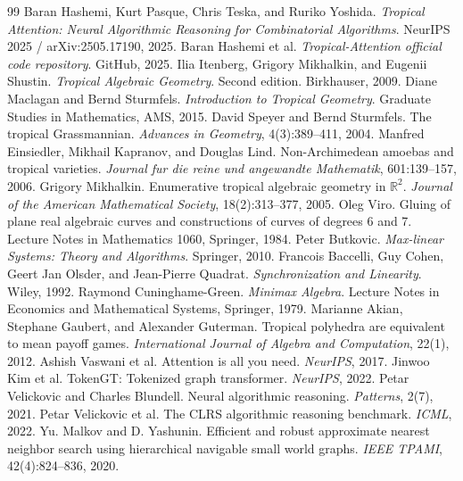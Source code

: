 \documentclass[11pt]{article}
\theoremstyle{definition}
\theoremstyle{remark}
\begin{document}
\begin{thebibliography}{99}
 Baran Hashemi, Kurt Pasque, Chris Teska, and Ruriko Yoshida. \emph{Tropical Attention: Neural Algorithmic Reasoning for Combinatorial Algorithms}. NeurIPS 2025 / arXiv:2505.17190, 2025.
 Baran Hashemi et al. \emph{Tropical-Attention official code repository}. GitHub, 2025.
 Ilia Itenberg, Grigory Mikhalkin, and Eugenii Shustin. \emph{Tropical Algebraic Geometry}. Second edition. Birkhauser, 2009.
 Diane Maclagan and Bernd Sturmfels. \emph{Introduction to Tropical Geometry}. Graduate Studies in Mathematics, AMS, 2015.
 David Speyer and Bernd Sturmfels. The tropical Grassmannian. \emph{Advances in Geometry}, 4(3):389--411, 2004.
 Manfred Einsiedler, Mikhail Kapranov, and Douglas Lind. Non-Archimedean amoebas and tropical varieties. \emph{Journal fur die reine und angewandte Mathematik}, 601:139--157, 2006.
 Grigory Mikhalkin. Enumerative tropical algebraic geometry in \(\mathbb R^2\). \emph{Journal of the American Mathematical Society}, 18(2):313--377, 2005.
 Oleg Viro. Gluing of plane real algebraic curves and constructions of curves of degrees 6 and 7. Lecture Notes in Mathematics 1060, Springer, 1984.
 Peter Butkovic. \emph{Max-linear Systems: Theory and Algorithms}. Springer, 2010.
 Francois Baccelli, Guy Cohen, Geert Jan Olsder, and Jean-Pierre Quadrat. \emph{Synchronization and Linearity}. Wiley, 1992.
 Raymond Cuninghame-Green. \emph{Minimax Algebra}. Lecture Notes in Economics and Mathematical Systems, Springer, 1979.
 Marianne Akian, Stephane Gaubert, and Alexander Guterman. Tropical polyhedra are equivalent to mean payoff games. \emph{International Journal of Algebra and Computation}, 22(1), 2012.
 Ashish Vaswani et al. Attention is all you need. \emph{NeurIPS}, 2017.
 Jinwoo Kim et al. TokenGT: Tokenized graph transformer. \emph{NeurIPS}, 2022.
 Petar Velickovic and Charles Blundell. Neural algorithmic reasoning. \emph{Patterns}, 2(7), 2021.
 Petar Velickovic et al. The CLRS algorithmic reasoning benchmark. \emph{ICML}, 2022.
 Yu. Malkov and D. Yashunin. Efficient and robust approximate nearest neighbor search using hierarchical navigable small world graphs. \emph{IEEE TPAMI}, 42(4):824--836, 2020.

\end{thebibliography}
\end{document}
